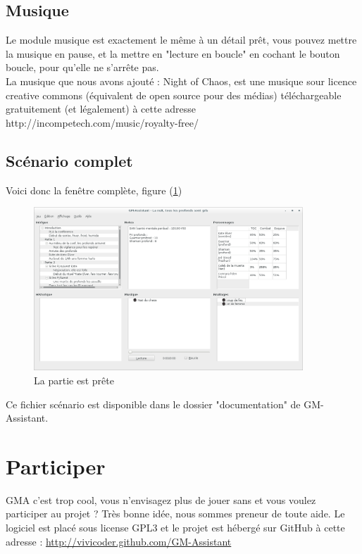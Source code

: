 \documentclass[a4paper,12pt]{article}
\begin{document}
\subsection{Musique}
Le module musique est exactement le même à un détail prêt, vous pouvez mettre la musique en pause, et la mettre en "lecture en boucle" en cochant le bouton boucle, pour qu'elle ne s'arrête pas.
\\
La musique que nous avons ajouté : Night of Chaos, est une musique sour licence creative commons (équivalent de open source pour des médias) téléchargeable gratuitement (et légalement) à cette adresse http://incompetech.com/music/royalty-free/

\subsection{Scénario complet}
Voici donc la fenêtre complète, figure (\ref{scenario_complet})
\begin{figure}[h!]
    \includegraphics[width=0.9\textwidth]{scenario_complet}
    \caption{La partie est prête}
    \label{scenario_complet}
\end{figure}

Ce fichier scénario est disponible dans le dossier "documentation" de GM-Assistant.

\section{Participer}\label{participer}
GMA c'est trop cool, vous n'envisagez plus de jouer sans et vous voulez participer au projet ?
Très bonne idée, nous sommes preneur de toute aide.
Le logiciel est placé sous license GPL3 et le projet est hébergé sur GitHub à cette adresse :
\href{http://vivicoder.github.com/GM-Assistant}{http://vivicoder.github.com/GM-Assistant}
\end{document}
